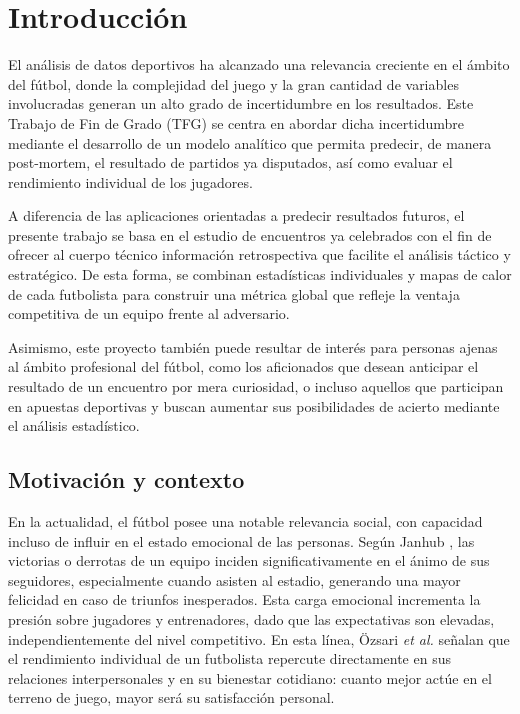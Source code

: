 \chapter{Introducción}

El análisis de datos deportivos ha alcanzado una relevancia creciente en el ámbito del fútbol, donde la complejidad del juego y la gran cantidad de variables involucradas generan un alto grado de incertidumbre en los resultados. Este Trabajo de Fin de Grado (TFG) se centra en abordar dicha incertidumbre mediante el desarrollo de un modelo analítico que permita predecir, de manera post-mortem, el resultado de partidos ya disputados, así como evaluar el rendimiento individual de los jugadores.

A diferencia de las aplicaciones orientadas a predecir resultados futuros, el presente trabajo se basa en el estudio de encuentros ya celebrados con el fin de ofrecer al cuerpo técnico información retrospectiva que facilite el análisis táctico y estratégico. De esta forma, se combinan estadísticas individuales y mapas de calor de cada futbolista para construir una métrica global que refleje la ventaja competitiva de un equipo frente al adversario.

Asimismo, este proyecto también puede resultar de interés para personas ajenas al ámbito profesional del fútbol, como los aficionados que desean anticipar el resultado de un encuentro por mera curiosidad, o incluso aquellos que participan en apuestas deportivas y buscan aumentar sus posibilidades de acierto mediante el análisis estadístico.

\section{Motivación y contexto}

En la actualidad, el fútbol posee una notable relevancia social, con capacidad incluso de influir en el estado emocional de las personas. Según Janhub \cite{impact-football-mood}, las victorias o derrotas de un equipo inciden significativamente en el ánimo de sus seguidores, especialmente cuando asisten al estadio, generando una mayor felicidad en caso de triunfos inesperados. Esta carga emocional incrementa la presión sobre jugadores y entrenadores, dado que las expectativas son elevadas, independientemente del nivel competitivo. En esta línea, Özsari \textit{et al.} \cite{act-footballist} señalan que el rendimiento individual de un futbolista repercute directamente en sus relaciones interpersonales y en su bienestar cotidiano: cuanto mejor actúe en el terreno de juego, mayor será su satisfacción personal.

